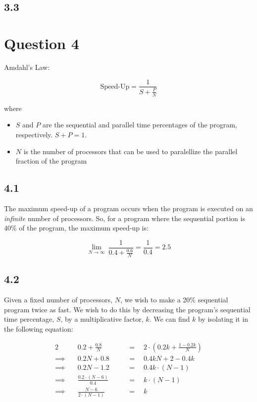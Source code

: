 \documentclass[11pt, letterpaper]{article}
\begin{document}
\subsection*{3.3}

\section*{Question 4}

Amdahl's Law:

$$
\text{Speed-Up} = \frac{1}{S + \frac{P}{N}}
$$

where

\begin{itemize}
    \item $S$ and $P$ are the sequential and parallel time percentages of the program, respectively. $S + P = 1$.
    \item $N$ is the number of processors that can be used to paralellize the parallel fraction of the program
\end{itemize}

\subsection*{4.1}

The maximum speed-up of a program occurs when the program is executed on an \textit{infinite} number of processors. So, for a program where the sequential portion is $40\%$ of the program, the maximum speed-up is:

$$
\lim_{N \to \infty}\ {\frac{1}{0.4 + \frac{0.6}{N}}} = \frac{1}{0.4} = 2.5
$$

\subsection*{4.2}

Given a fixed number of processors, $N$, we wish to make a 20\% sequential program twice as fast. We wish to do this by decreasing the program's sequential time percentage, $S$, by a multiplicative factor, $k$. We can find $k$ by isolating it in the following equation:

\begin{alignat*}{2}
            & \quad 0.2 + \frac{0.8}{N}           \quad &&= \quad 2 \cdot \left(0.2 k + \frac{1 - 0.2 k}{N}\right)\\
    \implies& \quad 0.2N + 0.8                    \quad &&= \quad 0.4kN + 2 - 0.4k\\
    \implies& \quad 0.2N - 1.2                    \quad &&= \quad 0.4k \cdot (N - 1)\\
    \implies& \quad \frac{0.2 \cdot (N - 6)}{0.4} \quad &&= \quad k \cdot (N - 1)\\
    \implies& \quad \frac{N - 6}{2 \cdot (N - 1)} \quad &&= \quad k\\
\end{alignat*}
\end{document}
